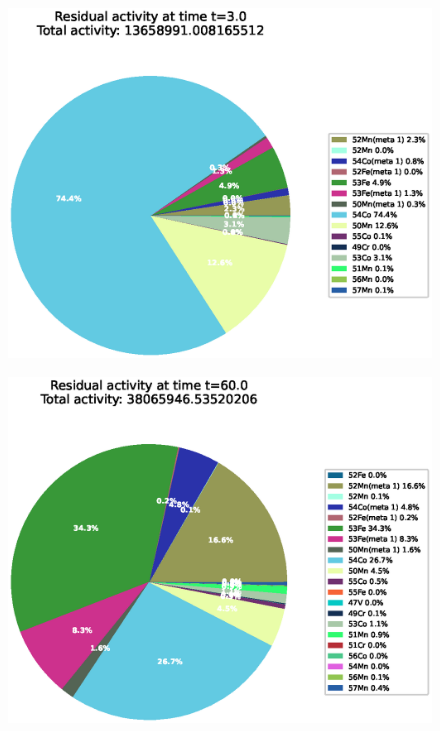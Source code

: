\begin{figure}[!htb]
\centering
\includegraphics[width=0.8\linewidth]{chapters/activity_code/fe-activity-v2/residual-activity/0001_3.eps}
\caption{}
\label{fig:activity-v2-residual-activity-3s}
\end{figure}

\begin{figure}[!htb]
\centering
\includegraphics[width=0.8\linewidth]{chapters/activity_code/fe-activity-v2/residual-activity/0020_60.eps}
\caption{}
\label{fig:activity-v2-residual-activity-60s}
\end{figure}

